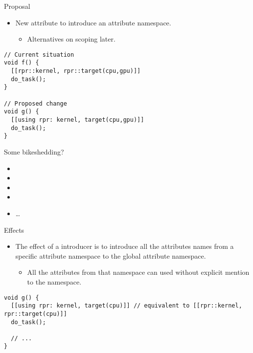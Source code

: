 \begin{frame}[t,fragile]{Proposal}
\begin{itemize}
  \item New attribute to introduce an attribute namespace.
    \begin{itemize}
      \item Alternatives on scoping later.
    \end{itemize}
\end{itemize}

\vfill
\begin{lstlisting}
// Current situation
void f() {
  [[rpr::kernel, rpr::target(cpu,gpu)]]
  do_task();
}

// Proposed change
void g() {
  [[using rpr: kernel, target(cpu,gpu)]]
  do_task();
}
\end{lstlisting}
\end{frame}

\begin{frame}[t]{Some bikeshedding?}
\begin{itemize}
  \item {}
  \item {}
  \item {}
  \item {}
  \item \ldots
\end{itemize}
\end{frame}

\begin{frame}[t,fragile]{Effects}
\begin{itemize}
  \item The effect of a  introducer is to introduce all the attributes
        names from a specific attribute namespace to the global attribute namespace.
    \begin{itemize}
      \item All the attributes from that namespace
            can used without explicit mention to the namespace.
    \end{itemize}
\end{itemize}

\begin{lstlisting}
void g() {
  [[using rpr: kernel, target(cpu)]] // equivalent to [[rpr::kernel, rpr::target(cpu)]]
  do_task();

  // ...
}
\end{lstlisting}
\end{frame}

